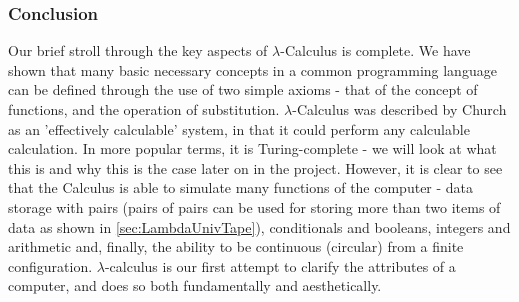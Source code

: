 \documentclass[Master.tex]{subfiles}
\begin{document}
\subsubsection{Conclusion}
Our brief stroll through the key aspects of $\lambda$-Calculus is complete. We have shown that many basic necessary concepts in a common programming language can be defined through the use of two simple axioms - that of the concept of functions, and the operation of substitution. $\lambda$-Calculus was described by Church as an 'effectively calculable' system, in that it could perform any calculable calculation. In more popular terms, it is Turing-complete - we will look at what this is and why this is the case later on in the project. However, it is clear to see that the Calculus is able to simulate many functions of the computer - data storage with pairs (pairs of pairs can be used for storing more than two items of data as shown in \cref{sec:LambdaUnivTape}), conditionals and booleans, integers and arithmetic and, finally, the ability to be continuous (circular) from a finite configuration. $\lambda$-calculus is our first attempt to clarify the attributes of a computer, and does so both fundamentally and aesthetically.
\end{document}
